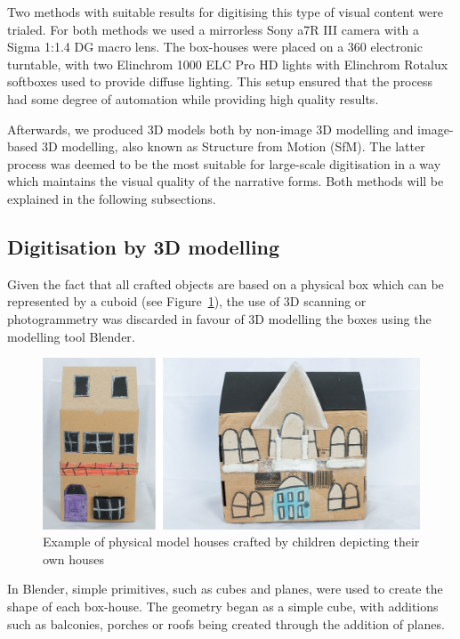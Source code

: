 \documentclass[acmlarge,screen,dvipsnames]{acmart}
\begin{document}
Two methods with suitable results for digitising this type of visual content were trialed. For both methods we used a mirrorless Sony a7R III camera with a Sigma 1:1.4 DG
macro lens. The box-houses were placed on a 360 electronic turntable, with two
Elinchrom 1000 ELC Pro HD lights with Elinchrom Rotalux softboxes used to
provide diffuse lighting. This setup ensured that the process had some degree of automation while providing
high quality results.

Afterwards, we produced 3D models both by non-image 3D modelling and image-based 3D modelling, also known as Structure from Motion (SfM). The latter process was deemed to be the most suitable for large-scale digitisation in a way which maintains the visual quality of the narrative forms. Both methods will be explained in the following subsections.

\subsection{Digitisation by 3D modelling}
Given the fact that all crafted objects are based on a physical box
which can be represented by a cuboid (see Figure~\ref{fig:boxes}), the use of
3D scanning or photogrammetry was discarded in favour of 3D modelling the
boxes using the modelling tool Blender\cite{blender}. 


\begin{figure}[h] \centering
\includegraphics[width=0.7\linewidth]{images/boxes.png} \caption{Example
of physical model houses crafted by children depicting their own houses}
\label{fig:boxes} \end{figure}

In Blender, simple primitives, such as cubes and planes, were used
to create the shape of each box-house. The geometry began as
a simple cube, with additions such as balconies, porches or roofs being
created through the addition of planes.
\end{document}
